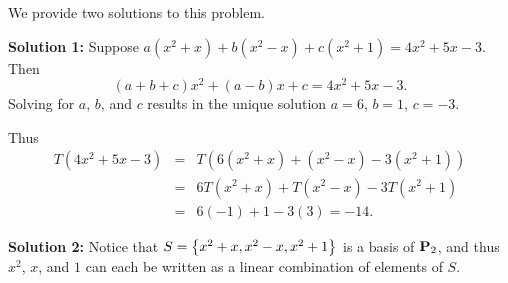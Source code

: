 \begin{solution}
  We provide two solutions to this problem.

  \textbf{Solution 1:}
  Suppose $a(x^2+x) + b(x^2-x) + c(x^2+1) = 4x^2+5x-3$.  Then
  \begin{equation*}
    (a+b+c)x^2 + (a-b)x + c = 4x^2+5x-3.
  \end{equation*}
  Solving for $a$, $b$, and $c$ results in the unique solution
  $a=6$, $b=1$, $c=-3$.

  Thus
  \begin{eqnarray*}
    T(4x^2+5x-3)
    & = & T(6(x^2+x) + (x^2-x) -3(x^2+1)) \\
    & = & 6T(x^2+x) + T(x^2-x) -3T(x^2+1) \\
    & = & 6(-1) + 1 -3(3) = -14.
  \end{eqnarray*}

  \textbf{Solution 2:}
  Notice that $S=\left\{x^2+x, x^2-x, x^2+1\right\}$ is a basis of $\mathbf{P}_2$,
  and thus $x^2$, $x$, and $1$ can each be written as a linear
  combination of elements of $S$.


\end{solution}
